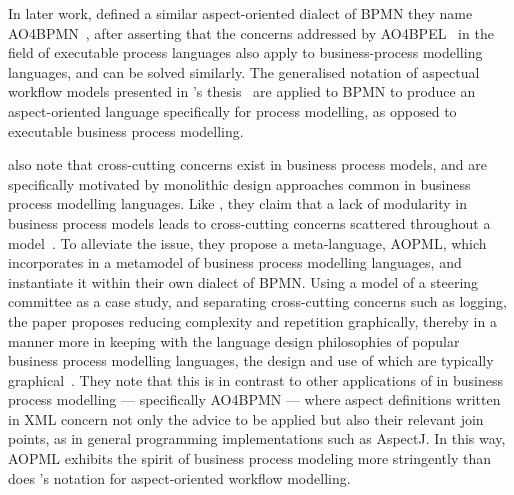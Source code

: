 In later work, \citeauthor{charfi2010AO4BPMN} defined a similar aspect-oriented
dialect of BPMN they name AO4BPMN~\cite{charfi2010AO4BPMN}, after asserting that
the concerns addressed by
AO4BPEL~\cite{Charfi2006AspectOrientedWL,charfi2007ao4bpel} in the field of
executable process languages also apply to business-process modelling languages,
and can be solved similarly. The generalised notation of aspectual
workflow models presented in \citeauthor{Charfi2006AspectOrientedWL}'s
thesis~\cite{Charfi2006AspectOrientedWL} are applied to BPMN to produce an
aspect-oriented language specifically for process modelling, as opposed to
executable business process modelling. 

 also note that cross-cutting concerns exist in
business process models, and are specifically motivated by monolithic design
approaches common in business process modelling languages. Like
\citeauthor{kiczales1997aspect}, they claim that a lack of modularity in
business process models leads to cross-cutting concerns scattered throughout a
model~\cite{Cappelli_AOBPM}. To alleviate the issue, they propose a
meta-language, AOPML, which incorporates \aspectorientation{} in a metamodel of
business process modelling languages, and instantiate it within their own
dialect of BPMN. Using a model of a steering committee as a case study, and
separating cross-cutting concerns such as logging, the paper proposes reducing
complexity and repetition graphically, thereby in a manner more in keeping with
the language design philosophies of popular business process modelling
languages, the design and use of which are typically
graphical~\cite{OMG-BPMN-SPEC,opm_original,OMG-UML-SPEC}. They note that this is
in contrast to other applications of \aspectorientation{} in business process
modelling --- specifically AO4BPMN --- where aspect definitions written in
XML concern not only the advice to be applied but also their relevant join
points, as in general programming \aspectorientation{} implementations such as
AspectJ. In this way, AOPML exhibits the spirit of business process
modeling more stringently than does \citeauthor{Charfi2006AspectOrientedWL}'s
notation for aspect-oriented workflow modelling.

